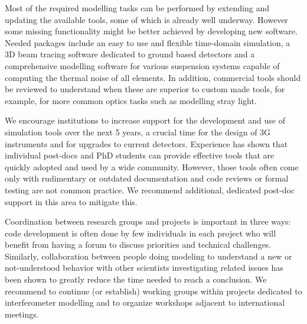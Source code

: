 Most of the required modelling tasks can be performed by extending and updating the available tools, some of which is already well underway. However some missing functionality might be better achieved by developing new software. Needed packages include an easy to use and flexible time-domain simulation, a 3D beam tracing software dedicated to ground based detectors and a comprehensive modelling software for various suspension systems capable of computing the thermal noise of all elements. In addition, commercial tools should be reviewed to understand when these are superior to custom made tools, for example, for more common optics tasks such as modelling stray light.

We encourage institutions to increase support for the development and use of simulation tools over the next 5 years, a crucial time for the design of 3G instruments and for upgrades to current detectors.
Experience has shown that individual post-docs and PhD students can provide effective tools that are quickly adopted and used by a wide community. However, those tools often come only with rudimentary or outdated documentation and code reviews or formal testing 
are not common practice. We recommend additional, dedicated post-doc support in this area to mitigate this.

Coordination between research groups and projects is important in three ways:
code development is often done by few individuals in each project who will benefit from having a forum to discuss priorities and technical challenges. 
Similarly, collaboration between people doing modeling to understand a new or not-understood behavior with other scientists investigating related issues has been shown to greatly reduce the time needed to reach a conclusion. 
We recommend to continue (or establish) working groups within projects dedicated to interferometer modelling and to organize workshops adjacent to international meetings.




